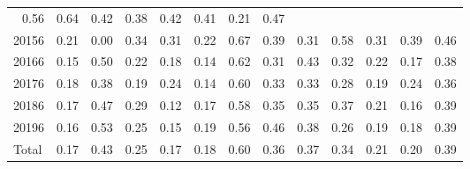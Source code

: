 \begin{table}[!h]
\begin{tabular}{lllllllllllll}
  \multicolumn{1}{r}{0.56} &
  \multicolumn{1}{r}{0.64} &
  \multicolumn{1}{r}{0.42} &
  \multicolumn{1}{r}{0.38} &
  \multicolumn{1}{r}{0.42} &
  \multicolumn{1}{r}{0.41} &
  \multicolumn{1}{r}{0.21} &
  \multicolumn{1}{r}{0.47} \\
\multicolumn{1}{l}{\hspace{1em}20156} &
  \multicolumn{1}{|r}{0.21} &
  \multicolumn{1}{r}{0.00} &
  \multicolumn{1}{r}{0.34} &
  \multicolumn{1}{r}{0.31} &
  \multicolumn{1}{r}{0.22} &
  \multicolumn{1}{r}{0.67} &
  \multicolumn{1}{r}{0.39} &
  \multicolumn{1}{r}{0.31} &
  \multicolumn{1}{r}{0.58} &
  \multicolumn{1}{r}{0.31} &
  \multicolumn{1}{r}{0.39} &
  \multicolumn{1}{r}{0.46} \\
\multicolumn{1}{l}{\hspace{1em}20166} &
  \multicolumn{1}{|r}{0.15} &
  \multicolumn{1}{r}{0.50} &
  \multicolumn{1}{r}{0.22} &
  \multicolumn{1}{r}{0.18} &
  \multicolumn{1}{r}{0.14} &
  \multicolumn{1}{r}{0.62} &
  \multicolumn{1}{r}{0.31} &
  \multicolumn{1}{r}{0.43} &
  \multicolumn{1}{r}{0.32} &
  \multicolumn{1}{r}{0.22} &
  \multicolumn{1}{r}{0.17} &
  \multicolumn{1}{r}{0.38} \\
\multicolumn{1}{l}{\hspace{1em}20176} &
  \multicolumn{1}{|r}{0.18} &
  \multicolumn{1}{r}{0.38} &
  \multicolumn{1}{r}{0.19} &
  \multicolumn{1}{r}{0.24} &
  \multicolumn{1}{r}{0.14} &
  \multicolumn{1}{r}{0.60} &
  \multicolumn{1}{r}{0.33} &
  \multicolumn{1}{r}{0.33} &
  \multicolumn{1}{r}{0.28} &
  \multicolumn{1}{r}{0.19} &
  \multicolumn{1}{r}{0.24} &
  \multicolumn{1}{r}{0.36} \\
\multicolumn{1}{l}{\hspace{1em}20186} &
  \multicolumn{1}{|r}{0.17} &
  \multicolumn{1}{r}{0.47} &
  \multicolumn{1}{r}{0.29} &
  \multicolumn{1}{r}{0.12} &
  \multicolumn{1}{r}{0.17} &
  \multicolumn{1}{r}{0.58} &
  \multicolumn{1}{r}{0.35} &
  \multicolumn{1}{r}{0.35} &
  \multicolumn{1}{r}{0.37} &
  \multicolumn{1}{r}{0.21} &
  \multicolumn{1}{r}{0.16} &
  \multicolumn{1}{r}{0.39} \\
\multicolumn{1}{l}{\hspace{1em}20196} &
  \multicolumn{1}{|r}{0.16} &
  \multicolumn{1}{r}{0.53} &
  \multicolumn{1}{r}{0.25} &
  \multicolumn{1}{r}{0.15} &
  \multicolumn{1}{r}{0.19} &
  \multicolumn{1}{r}{0.56} &
  \multicolumn{1}{r}{0.46} &
  \multicolumn{1}{r}{0.38} &
  \multicolumn{1}{r}{0.26} &
  \multicolumn{1}{r}{0.19} &
  \multicolumn{1}{r}{0.18} &
  \multicolumn{1}{r}{0.39} \\
\multicolumn{1}{l}{\hspace{1em}Total} &
  \multicolumn{1}{|r}{0.17} &
  \multicolumn{1}{r}{0.43} &
  \multicolumn{1}{r}{0.25} &
  \multicolumn{1}{r}{0.17} &
  \multicolumn{1}{r}{0.18} &
  \multicolumn{1}{r}{0.60} &
  \multicolumn{1}{r}{0.36} &
  \multicolumn{1}{r}{0.37} &
  \multicolumn{1}{r}{0.34} &
  \multicolumn{1}{r}{0.21} &
  \multicolumn{1}{r}{0.20} &
  \multicolumn{1}{r}{0.39} \\
\cline{1-13}
\end{tabular}
\end{table}
